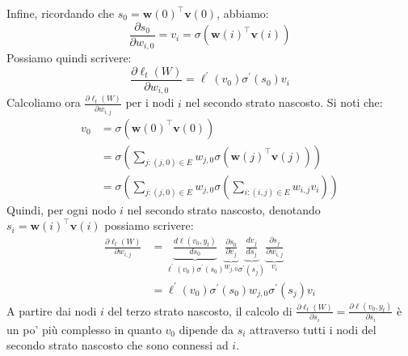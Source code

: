 \documentclass[\main/main.tex]{subfiles}
\begin{document}
\begin{definition}
\begin{multicols}{2}
        Infine, ricordando che \(s_{0}=\boldsymbol{w}(0)^{\top} \boldsymbol{v}(0)\), abbiamo:
        \[\frac{\partial s_{0}}{\partial w_{i, 0}}=v_{i}=\sigma\left(\boldsymbol{w}(i)^{\top} \boldsymbol{v}(i)\right)\]
        Possiamo quindi scrivere:
        \[\frac{\partial \ell_{t}(W)}{\partial w_{i, 0}}=\ell^{\prime}\left(v_{0}\right) \sigma^{\prime}\left(s_{0}\right) v_{i}\]
        Calcoliamo ora \(\frac{\partial \ell_{t}(W)}{\partial w_{i, j}}\) per i nodi \(i\) nel secondo strato nascosto. Si noti che:
        \begin{align*}
            v_{0}&=\sigma\left(\boldsymbol{w}(0)^{\top} \boldsymbol{v}(0)\right)\\
            &=\sigma\left(\sum_{j :(j, 0) \in E} w_{j, 0} \sigma\left(\boldsymbol{w}(j)^{\top} \boldsymbol{v}(j)\right)\right)\\
            &=\sigma\left(\sum_{j :(j, 0) \in E} w_{j, 0} \sigma\left(\sum_{i :(i, j) \in E} w_{i, j} v_{i}\right)\right)
        \end{align*}
        Quindi, per ogni nodo \(i\) nel secondo strato nascosto, denotando \(s_{i}=\boldsymbol{w}(i)^{\top} \boldsymbol{v}(i)\) possiamo scrivere:
        \begin{align*}
            \frac{\partial \ell_{t}(W)}{\partial w_{i, j}}&=\underbrace{\frac{d \ell\left(v_{0}, y_{t}\right)}{d s_{0}}}_{\ell^{\prime}\left(v_{0}\right) \sigma^{\prime}\left(s_{0}\right)} \underbrace{\frac{\partial s_{0}}{\partial v_{j}}}_{w_{j, 0}} \underbrace{\frac{d v_{j}}{d s_{j}}}_{\sigma^{\prime}\left(s_{j}\right)} \underbrace{\frac{\partial s_{j}}{\partial w_{i, j}}}_{v_{i}}\\&=\ell^{\prime}\left(v_{0}\right) \sigma^{\prime}\left(s_{0}\right) w_{j, 0} \sigma^{\prime}\left(s_{j}\right) v_{i}
        \end{align*}
        A partire dai nodi \(i\) del terzo strato nascosto, il calcolo di \(\frac{\partial \ell_{t}(W)}{\partial s_{i}}=\frac{\partial \ell\left(v_{0}, y_{t}\right)}{\partial s_{i}}\) è un po' più complesso in quanto \(v_0\) dipende da \(s_i\) attraverso tutti i nodi del secondo strato nascosto che sono connessi ad \(i\). 
        

\end{multicols}
\end{definition}
\end{document}
